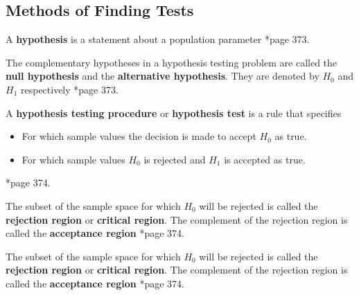 \subsection*{Methods of Finding Tests}

\begin{defe}[Hypothesis] \label{defe: hypothesis}
    A {\bf hypothesis} is a statement about a population parameter \cite{CasellaGeorge2001SI}*{page 373}.
\end{defe}

\begin{defe} \label{defe: comp_hypothesis}
    The complementary hypotheses in a hypothesis testing problem are called the {\bf null hypothesis} and the {\bf alternative hypothesis}. They are denoted by $H_0$ and $H_1$ respectively \cite{CasellaGeorge2001SI}*{page 373}.
\end{defe}

\begin{defe} \label{defe: hypothesis_test}
    A {\bf hypothesis testing procedure} or {\bf hypothesis test} is a rule that specifies
    \begin{itemize}
        \item For which sample values the decision is made to accept $H_0$ as true.
        \item For which sample values $H_0$ is rejected and $H_1$ is accepted as true.
    \end{itemize}
    \cite{CasellaGeorge2001SI}*{page 374}.
\end{defe}

\begin{defe} \label{defe: crit_region}
    The subset of the sample space for which $H_0$ will be rejected is called the {\bf rejection region} or {\bf critical region}. The complement of the rejection region is called the {\bf acceptance region} \cite{CasellaGeorge2001SI}*{page 374}.
\end{defe}

\begin{defe} \label{defe: accept_reject_regions}
    The subset of the sample space for which $H_0$ will be rejected is called the {\bf rejection region} or {\bf critical region}. The complement of the rejection region is called the {\bf acceptance region} \cite{CasellaGeorge2001SI}*{page 374}.
\end{defe}

